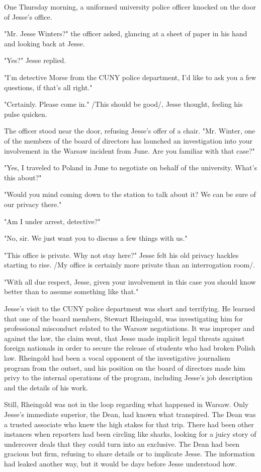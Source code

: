 One Thursday morning, a uniformed university police officer knocked on the door of Jesse's office.

"Mr. Jesse Winters?" the officer asked, glancing at a sheet of paper in his hand and looking back at Jesse.

"Yes?" Jesse replied.

"I'm detective Morse from the CUNY police department, I'd like to ask you a few questions, if that's all right."

"Certainly.  Please come in."  /This should be good/, Jesse thought, feeling his pulse quicken.

The officer stood near the door, refusing Jesse's offer of a chair.  "Mr. Winter, one of the members of the board of directors has launched an investigation into your involvement in the Warsaw incident from June.  Are you familiar with that case?"

"Yes, I traveled to Poland in June to negotiate on behalf of the university.  What's this about?"

"Would you mind coming down to the station to talk about it?  We can be sure of our privacy there."

"Am I under arrest, detective?"

"No, sir.  We just want you to discuss a few things with us."

"This office is private.  Why not stay here?"  Jesse felt his old privacy hackles starting to rise.  /My office is certainly more private than an interrogation room/.

"With all due respect, Jesse, given your involvement in this case you should know better than to assume something like that."


Jesse's visit to the CUNY police department was short and terrifying.  He learned that one of the board members, Stewart Rheingold, was investigating him for professional misconduct related to the Warsaw negotiations.  It was improper and against the law, the claim went, that Jesse made implicit legal threats against foreign nationals in order to secure the release of students who had broken Polish law.  Rheingold had been a vocal opponent of the investigative journalism program from the outset, and his position on the board of directors made him privy to the internal operations of the program, including Jesse's job description and the details of his work.

Still, Rheingold was not in the loop regarding what happened in Warsaw.  Only Jesse's immediate superior, the Dean, had known what transpired.  The Dean was a trusted associate who knew the high stakes for that trip.  There had been other instances when reporters had been circling like sharks, looking for a juicy story of undercover deals that they could turn into an exclusive.  The Dean had been gracious but firm, refusing to share details or to implicate Jesse.  The information had leaked another way, but it would be days before Jesse understood how.

